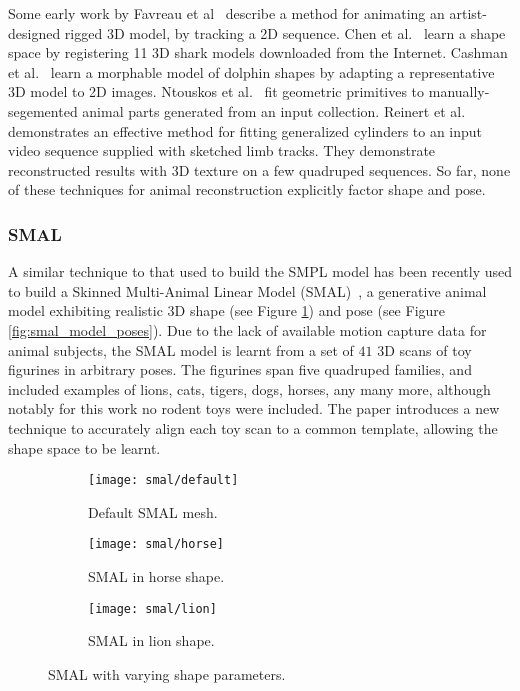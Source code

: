 Some early work by Favreau et al~\cite{xxx} describe a method for animating an artist-designed rigged 3D model, by tracking a 2D sequence. Chen et al.~\cite{xxx} learn a shape space by registering 11 3D shark models downloaded from the Internet. Cashman et al.~\cite{xxx} learn a morphable model of dolphin shapes by adapting a representative 3D model to 2D images. Ntouskos et al.~\cite{xxx} fit geometric primitives to manually-segemented animal parts generated from an input collection. Reinert et al.~\cite{xxx} demonstrates an effective method for fitting generalized cylinders to an input video sequence supplied with sketched limb tracks. They demonstrate reconstructed results with 3D texture on a few quadruped sequences. So far, none of these techniques for animal reconstruction explicitly factor shape and pose.

\subsubsection{SMAL}
A similar technique to that used to build the SMPL model has been recently used to build a Skinned Multi-Animal Linear Model (SMAL)~\cite{zuffi2017menagerie}, a generative animal model exhibiting realistic 3D shape (see Figure \ref{fig:smal_model_shape}) and pose (see Figure \ref{fig:smal_model_poses}). Due to the lack of available motion capture data for animal subjects, the SMAL model is learnt from a set of $41$ 3D scans of toy figurines in arbitrary poses. The figurines span five quadruped families, and included examples of lions, cats, tigers, dogs, horses, any many more, although notably for this work no rodent toys were included. The paper introduces a new technique to accurately align each toy scan to a common template, allowing the shape space to be learnt.

\begin{figure}[H]
    \centering
    \begin{subfigure}{0.3\linewidth}
    \centering
        \texttt{[image: smal/default]}
        \caption{Default SMAL mesh.}
    \end{subfigure}%
    \begin{subfigure}{0.3\linewidth}
    \centering
        \texttt{[image: smal/horse]}
        \caption{SMAL in horse shape.}
    \end{subfigure}%
    \begin{subfigure}{0.3\linewidth}
        \centering
            \texttt{[image: smal/lion]}
            \caption{SMAL in lion shape.}
    \end{subfigure}%
    \caption{SMAL with varying shape parameters.}
    \label{fig:smal_model_shape}
    \end{figure}

